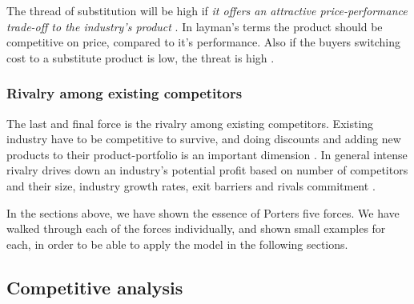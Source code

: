 The thread of substitution will be high if \emph{it offers an attractive price-performance trade-off to the industry's product} \cite[p.~84]{porter2008five}. In layman's terms the product should be competitive on price, compared to it's performance. Also if the buyers switching cost to a substitute product is low, the threat is high \cite[p.~84]{porter2008five}.

\subsubsection*{Rivalry among existing competitors}
The last and final force is the rivalry among existing competitors. Existing industry have to be competitive to survive, and doing discounts and adding new products to their product-portfolio is an important dimension \cite[p.~85]{porter2008five}. In general intense rivalry drives down an industry's potential profit based on number of competitors and their size, industry growth rates, exit barriers and rivals commitment \cite[p.~85]{porter2008five}. 


In the sections above, we have shown the essence of Porters five forces. We have walked through each of the forces individually, and shown small examples for each, in order to be able to apply the model in the following sections.


















\subsection{Competitive analysis}








% 

